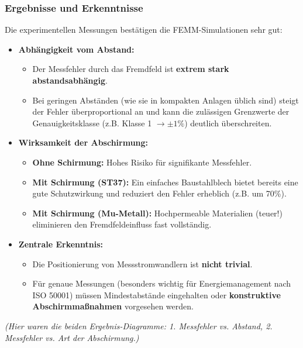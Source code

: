 \begin{frame}
    \frametitle{Ergebnisse und Erkenntnisse}
    Die experimentellen Messungen bestätigen die FEMM-Simulationen sehr gut:
    \begin{itemize}
        \item \textbf{Abhängigkeit vom Abstand:}
              \begin{itemize}
                  \item Der Messfehler durch das Fremdfeld ist \textbf{extrem stark abstandsabhängig}.
                  \item Bei geringen Abständen (wie sie in kompakten Anlagen üblich sind) steigt der Fehler überproportional an und kann die zulässigen Grenzwerte der Genauigkeitsklasse (z.B. Klasse 1 $\rightarrow \pm 1\%$) deutlich überschreiten.
              \end{itemize}
        \item \textbf{Wirksamkeit der Abschirmung:}
              \begin{itemize}
                  \item \textbf{Ohne Schirmung:} Hohes Risiko für signifikante Messfehler.
                  \item \textbf{Mit Schirmung (ST37):} Ein einfaches Baustahlblech bietet bereits eine gute Schutzwirkung und reduziert den Fehler erheblich (z.B. um 70\%).
                  \item \textbf{Mit Schirmung (Mu-Metall):} Hochpermeable Materialien (teuer!) eliminieren den Fremdfeldeinfluss fast vollständig.
              \end{itemize}
        \item \textbf{Zentrale Erkenntnis:}
              \begin{itemize}
                  \item Die Positionierung von Messstromwandlern ist \textbf{nicht trivial}.
                  \item Für genaue Messungen (besonders wichtig für Energiemanagement nach ISO 50001) müssen Mindestabstände eingehalten oder \textbf{konstruktive Abschirmmaßnahmen} vorgesehen werden.
              \end{itemize}
    \end{itemize}
    \begin{center}
        \textit{(Hier waren die beiden Ergebnis-Diagramme: 1. Messfehler vs. Abstand, 2. Messfehler vs. Art der Abschirmung.)}
    \end{center}
\end{frame}